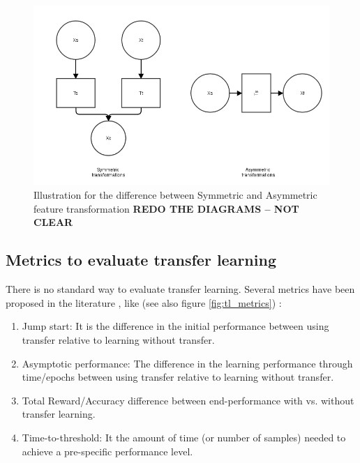   \begin{figure}[!htbp]
  \centering
  \includegraphics[scale=0.4]{images/sota/feature_transformation.png}
  \caption[Symmetric and Asymmetric transfer]{Illustration for the difference between Symmetric and Asymmetric feature transformation \textbf{REDO THE DIAGRAMS -- NOT CLEAR}}
  \label{fig:feature_transformation}
  \end{figure}

  \subsection{Metrics to evaluate transfer learning}
  \par There is no standard way to evaluate transfer learning. Several metrics have been proposed in the literature \citep{taylor2007cross}, like (see also figure \ref{fig:tl_metrics}) :
  \begin{enumerate}
      \item Jump start: It is the difference in the initial performance between using transfer relative to learning without transfer.
      \item Asymptotic performance: The difference in the learning performance through time/epochs between using transfer relative to learning without transfer.
      \item Total Reward/Accuracy difference between end-performance with vs. without transfer learning.
      \item Time-to-threshold: It the amount of time (or number of samples) needed to achieve a pre-specific performance level.
  \end{enumerate}

